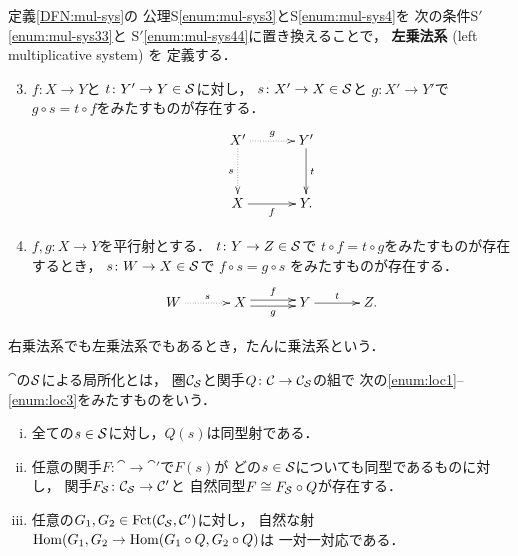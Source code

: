 \begin{Attention}
    定義\ref{DFN:mul-sys}の
    公理S\ref{enum:mul-sys3}とS\ref{enum:mul-sys4}を
    次の条件S\('\)\ref{enum:mul-sys33}と
    S\('\)\ref{enum:mul-sys44}に置き換えることで，
    \textbf{左乗法系} (left multiplicative system) を
    定義する．
    \begin{enumerate}[S\('\)1]
        \setcounter{enumi}{2}
        \item \(f\colon{X}\to{Y}\)と
        \(t\colon{Y'}\to{Y}\in\mathcal{S}\)に対し，
        \(s\colon{X'}\to{X}\in\mathcal{S}\)と
        \(g\colon{X'}\to{Y'}\)で
        \(g\circ{s}=t\circ{f}\)をみたすものが存在する．
        \[\vcenter{\xymatrix@C=32pt@R=32pt{
        X'
        \ar@{.>}[r]^-{g}
        \ar@{.>}[d]_-{s}
        &Y'
        \ar[d]^-{t}
        \\
        X
        \ar[r]_-{f}
        &
        Y.
        }}\]
        \label{enum:mul-sys33}
        \item \(f,g\colon{X}\to{Y}\)を平行射とする．
        \(t\colon{Y}\to{Z}\in\mathcal{S}\)で
        \(t\circ{f}=t\circ{g}\)をみたすものが存在するとき，
        \(s\colon{W}\to{X}\in\mathcal{S}\)で
        \(f\circ{s}=g\circ{s}\)
        をみたすものが存在する．
        \[\vcenter{\xymatrix@C=32pt@R=32pt{
        W
        \ar@{.>}[r]^-{s}
        &
        X
        \ar@<0.5ex>[r]^-{f}
        \ar@<-0.5ex>[r]_-{g}
        &Y
        \ar[r]^-{t}
        &Z.
        }}\]\label{enum:mul-sys44}
    \end{enumerate}
\end{Attention}

右乗法系でも左乗法系でもあるとき，たんに乗法系という．

\begin{Definition}
    \(\cat\)の\(\mathcal{S}\)による局所化とは，
    圏\(\mathcal{C}_\mathcal{S}\)と関手\(Q\colon\mathcal{C}\to\mathcal{C}_\mathcal{S}\)の組で
    次の\eqref{enum:loc1}--\eqref{enum:loc3}をみたすものをいう．
    \begin{enumerate}[(i)]
        \item 全ての\(s\in\mathcal{S}\)に対し，\(Q(s)\)は同型射である．\label{enum:loc1}
        \item 任意の関手\(F\colon\cat\to\cat'\)で\(F(s)\)が
        どの\(s\in\mathcal{S}\)についても同型であるものに対し，
        関手\(F_\mathcal{S}\colon\mathcal{C}_\mathcal{S}\to\mathcal{C}'\)と
        自然同型\(F\cong{F_\mathcal{S}\circ{Q}}\)が存在する．\label{enum:loc2}
        \item 任意の\(G_1,G_2\in\mathop{\mathrm{Fct}}\nolimits(\mathcal{C}_\mathcal{S},\mathcal{C}')\)に対し，
        自然な射\(\mathop{\mathrm{Hom}}\nolimits(G_1,G_2\to\mathop{\mathrm{Hom}}\nolimits(G_1\circ{Q},G_2\circ{Q})\)は
        一対一対応である．\label{enum:loc3}
    \end{enumerate}
\end{Definition}

